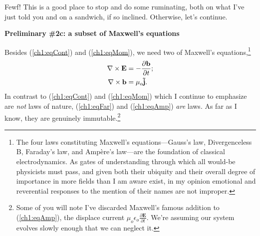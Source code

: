 Fewf! This is a good place to stop and do some ruminating, both on what I've
just told you and on a sandwich, if so inclined. Otherwise, let's continue.

\textbf{Preliminary \#2c: a subset of Maxwell's equations}

Besides (\ref{ch1:eqCont}) and (\ref{ch1:eqMom}), we need two of Maxwell's
equations,\footnote{The four laws constituting Maxwell's equations---Gauss's
  law, Divergenceless B, Faraday's law, and Amp\`{e}re's law---are the
  foundation of classical electrodynamics. As gates of understanding through
  which all would-be physicists must pass, and given both their ubiquity and
  their overall degree of importance in more fields than I am aware exist, in my
  opinion emotional and reverential responses to the mention of their names are
  not improper.}
\begin{subequations}
  \begin{align} {\bf \nabla} \times \mathbf{E} &= - \dfrac{\partial \mathbf{b}}{\partial t}; \label{ch1:eqFar} \\
    {\bf \nabla} \times \mathbf{b} &= \mu_o \mathbf{\tilde j}. \label{ch1:eqAmp}
  \end{align}
\end{subequations}
In contrast to (\ref{ch1:eqCont}) and (\ref{ch1:eqMom}) which I continue to
emphasize are \emph{not} laws of nature, (\ref{ch1:eqFar}) and (\ref{ch1:eqAmp})
\emph{are} laws. As far as I know, they are genuinely immutable.\footnote{Some
  of you will note I've discarded Maxwell's famous addition to
  (\ref{ch1:eqAmp}), the displace current $\mu_o \epsilon_o \frac{\partial
    \mathbf{E}}{\partial t}$. We're assuming our system evolves slowly enough
  that we can neglect it.}

